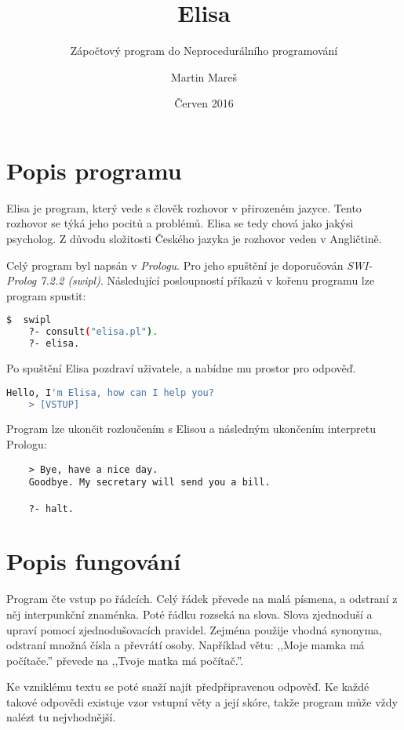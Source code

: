\documentclass[12pt,a4paper,titlepage]{scrartcl}
\title{Elisa}
\subtitle{Zápočtový program do Neprocedurálního programování}
\author{Martin Mareš}
\date{Červen 2016}
\begin{document}
	\maketitle
	\section{Popis programu}
	Elisa je program, který vede s člověk rozhovor v přirozeném jazyce. Tento rozhovor se týká jeho pocitů a problémů. Elisa se tedy chová jako jakýsi psycholog. Z důvodu složitosti Českého jazyka je rozhovor veden v Angličtině.
	\par
	Celý program byl napsán v \textit{Prologu}. Pro jeho spuštění je doporučován \textit{SWI-Prolog 7.2.2 (swipl)}. Následující posloupností příkazů v kořenu programu lze program spustit:
	\begin{lstlisting}[language=bash]
  	$  swipl
  	?- consult("elisa.pl").
  	?- elisa.
	\end{lstlisting}
	Po spuštění Elisa pozdraví uživatele, a nabídne mu prostor pro odpověď.
	\begin{lstlisting}[language=Bash]
  	Hello, I'm Elisa, how can I help you?
  	> [VSTUP]
	\end{lstlisting} 
	Program lze ukončit rozloučením s Elisou a následným ukončením interpretu Prologu:
	\begin{lstlisting}
  	> Bye, have a nice day.
  	Goodbye. My secretary will send you a bill.		
  	
	?- halt.
	\end{lstlisting}
	\section{Popis fungování}
	Program čte vstup po řádcích. Celý řádek převede na malá písmena, a odstraní z něj interpunkční znaménka. Poté řádku rozseká na slova. Slova zjednoduší a upraví pomocí zjednodušovacích pravidel. Zejména použije vhodná synonyma, odstraní množná čísla a převrátí osoby. Například větu: ,,Moje mamka má počítače.'' převede na ,,Tvoje matka má počítač.''. 
	\par
	Ke vzniklému textu se poté snaží najít předpřipravenou odpověď. Ke každé takové odpovědi existuje vzor vstupní věty a její skóre, takže program může vždy nalézt tu nejvhodnější.
\end{document}
